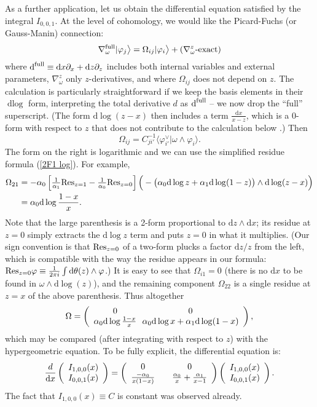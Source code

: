\documentclass[11pt]{article}
\renewcommand{\d}{\text{d}}
\newcommand{\be}{\begin{equation}}
\newcommand{\ee}{\end{equation}}
\newcommand{\braket}[2]{\big\langle{#1}|{#2}\big\rangle}
\newcommand{\ket}[1]{|{#1}\big\rangle}
\newcommand{\dual}{\vee}
\newcommand{\vphi}{\varphi}
\begin{document}
As a further application, let us obtain the differential equation satisfied by the integral $I_{0,0,1}$.
At the level of cohomology, we would like the Picard-Fuchs (or Gauss-Manin) connection: 
\be
 \nabla_\omega^{\rm full} \ket{\vphi_j} = \Omega_{ij} \ket{\vphi_i} + (\nabla_\omega^{z}\mbox{-exact})
\ee
where $\d^{\rm full} \equiv \d x \partial_x + \d z \partial_z$ includes both internal variables and external parameters, $\nabla_\omega^z$ only $z$-derivatives, and where $\Omega_{ij}$ does not depend on $z$. The calculation is particularly straightforward if we keep the basis elements in their $\d\log$ form, interpreting the total derivative $d$ as $\d^{\rm full}$ -- we now drop the ``full'' superscript. (The form $\d\log(z-x)$ then includes a term $\frac{\d x}{x-z}$, which is a 0-form with respect to $z$ that does not contribute to the calculation below \cite{Herrmann:2019upk}.) Then
\be
 \Omega_{ij} = C^{-1}_{ji'}\braket{\vphi_{i'}^\dual}{\omega\wedge \vphi_i}.
\ee
The form on the right is logarithmic and we can use the simplified residue formula (\ref{2F1 log}).
For example,
\be\begin{aligned}
 \Omega_{21} &=
 -\alpha_0 \left[\tfrac{1}{\alpha_1}{\rm Res}_{z=1}-\tfrac{1}{\alpha_0}{\rm Res}_{z=0}\right] \Big( -\big(\alpha_0 \d\log z+\alpha_1 \d\log(1-z)\big)\wedge \d\log(z-x)\Big)
  \\ &= \alpha_0 \d\log \frac{1-x}{x}.
\end{aligned}\ee
Note that the large parenthesis is a 2-form proportional to $\d z\wedge \d x$; its residue at $z=0$ simply extracts the $\d\log z$ term
and puts $z=0$ in what it multiplies. (Our sign convention is that ${\rm Res}_{z=0}$ of a two-form plucks a factor $\d z/z$ from the left,
which is compatible with the way the residue appears in our formula: ${\rm Res}_{z=0}\vphi \equiv \frac{1}{2\pi i} \int \d\theta(z)\wedge \vphi$.)
It is easy to see that $\Omega_{i1}=0$ (there is no $\d x$ to be found in $\omega\wedge \d\log(z)$), and the remaining component
$\Omega_{22}$ is a single residue at $z=x$ of the above parenthesis. Thus altogether
\be
 \Omega = \left(\begin{array}{c@{\ \ }c} 
 	0 & 0 \\ 
	\alpha_0 \d\log \frac{1-x}{x} 
		& \alpha_0 \d\log x + \alpha_1 \d\log(1-x) \end{array}\right),
\ee
which may be compared (after integrating with respect to $z$) with the hypergeometric equation.
To be fully explicit, the differential equation is:
\be
 \frac{d}{\d x} \left(\begin{array}{c} I_{1,0,0}(x) \\ I_{0,0,1}(x)\end{array}\right)
 = \left(\begin{array}{c@{\hspace{2em}}c} 0 & 0 \\ \frac{-\alpha_0}{x(1-x)} & \frac{\alpha_0}{x} + \frac{\alpha_1}{x-1} \end{array}\right)
 \left(\begin{array}{c} I_{1,0,0}(x) \\ I_{0,0,1}(x)\end{array}\right). \label{2F1 diff eq}
\ee
The fact that $I_{1,0,0}(x)\equiv C$ is constant was observed already.
\end{document}
